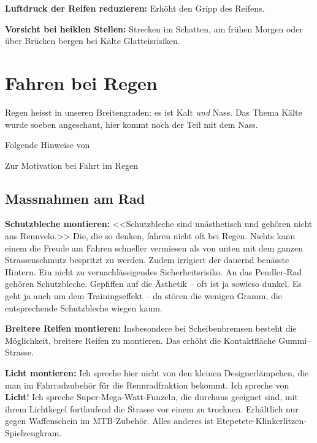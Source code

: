 \textbf{Luftdruck der Reifen reduzieren:}
Erhöht den Gripp des Reifens. 

\textbf{Vorsicht bei heiklen Stellen:}
Strecken im Schatten, am frühen Morgen oder über Brücken bergen bei Kälte Glatteisrisiken.

\section{Fahren bei Regen}
\label{sec:regen}

Regen heisst in unseren Breitengraden: es ist Kalt \emph{und} Nass.
Das Thema Kälte wurde soeben angeschaut, hier kommt noch der Teil mit dem Nass.

Folgende Hinweise von
\cite{Glass2014cyclingrain,Hurford2014rainyride,Prinz2014rain,Lovell2015tipswetweather,gcn2013rain,gcn2015rain}

Zur Motivation bei Fahrt im Regen \cite{Magnuson2013rain}

\subsection{Massnahmen am Rad}

\textbf{Schutzbleche montieren:}
<<Schutzbleche sind unästhetisch und gehören nicht ans Rennvelo.>>
Die, die so denken, fahren nicht oft bei Regen.
Nichts kann einem die Freude am Fahren schneller vermiesen als von unten mit dem ganzen Strassenschmutz bespritzt zu werden.
Zudem irrigiert der dauernd benässte Hintern. Ein nicht zu vernachlässigendes Sicherheitsrisiko.
An das Pendler-Rad gehören Schutzbleche.
Gepfiffen auf die Ästhetik -- oft ist ja sowieso dunkel.
Es geht ja auch um dem Trainingseffekt -- da stören die wenigen Gramm, die entsprechende Schutzbleche wiegen kaum.

\textbf{Breitere Reifen montieren:} 
Insbesondere bei Scheibenbremsen besteht die Möglichkeit, breitere Reifen zu montieren.
Das erhöht die Kontaktfläche Gummi--Strasse.

\textbf{Licht montieren:}
Ich spreche hier nicht von den kleinen Designerlämpchen, die man im Fahrradzubehör für die Rennradfraktion bekommt.
Ich spreche von \textbf{Licht}!
Ich spreche Super-Mega-Watt-Funzeln, die durchaus geeignet sind,
mit ihrem Lichtkegel fortlaufend die Strasse vor einem zu trocknen.
Erhältlich nur gegen Waffenschein im MTB-Zubehör.
Alles anderes ist Etepetete-Klinkerlitzen-Spielzeugkram.

